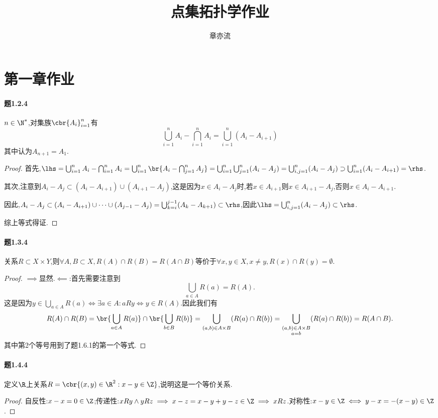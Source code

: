 \documentclass{article}
\title{点集拓扑学作业}
\author{章亦流}
\begin{document}
\maketitle
\tableofcontents

\section{第一章作业}

\paragraph{题1.2.4}$n\in \N^*$,对集族$\cbr{A_i}_{i=1}^n$有
$$\bigcup_{i=1}^n A_i-\bigcap_{i=1}^n A_i=\bigcup_{i=1}^n(A_i-A_{i+1})$$
其中认为$A_{n+1}=A_1$.
\begin{proof}
    首先,$\lhs=\bigcup_{i=1}^n A_i-\bigcap_{i=1}^n A_i=\bigcup_{i=1}^n \br{A_i-\bigcap_{j=1}^n A_j}=\bigcup_{i=1}^n\bigcup_{j=1}^n(A_i-A_j)=\bigcup_{i,j=1}^n (A_i-A_j)\supset \bigcup_{i=1}^n(A_i-A_{i+1})=\rhs$.

    其次,注意到$A_i-A_j\subset (A_i-A_{i+1})\cup (A_{i+1}-A_j)$,这是因为$x\in A_i-A_j$时,若$x\in A_{i+1}$则$x\in A_{i+1}-A_j$,否则$x\in A_i-A_{i+1}$.

    因此,$A_i-A_j\subset (A_i-A_{i+1})\cup \cdots \cup (A_{j-1}-A_j)=\bigcup_{k=i}^{j-1}(A_k-A_{k+1})\subset \rhs$,因此$\lhs=\bigcup_{i,j=1}^n(A_i-A_j)\subset \rhs$.

    综上等式得证.
\end{proof}

\paragraph{题1.3.4}关系$R\subset X\times Y$,则$\forall A,B\subset X, R(A)\cap R(B)=R(A\cap B)$等价于$\forall x,y\in X, x\neq y, R(x)\cap R(y)=\emptyset$.
\begin{proof}
    $\implies$显然.$\impliedby$:首先需要注意到$$\bigcup_{a\in A}R(a)=R(A).$$
    这是因为$y\in \bigcup_{a\in A}R(a)\iff \exists a\in A:aRy\iff y\in R(A)$.因此我们有
    $$R(A)\cap R(B)=\br{\bigcup_{a\in A}R(a)}\cap\br{\bigcup_{b\in B}R(b)}=\bigcup_{(a,b)\in A\times B}(R(a)\cap R(b))=\bigcup_{\substack{(a,b)\in A\times B\\ a=b}}(R(a)\cap R(b))=R(A\cap B).$$
    其中第2个等号用到了题1.6.1的第一个等式.
\end{proof}

\paragraph{题1.4.4}定义$\R$上关系$R=\cbr{(x,y)\in \R^2:x-y\in\Z}$,说明这是一个等价关系.
\begin{proof}
    自反性:$x-x=0\in\Z$;传递性:$xRy\land yRz\implies x-z=x-y+y-z\in\Z\implies xRz$.对称性:$x-y\in\Z\iff y-x=-(x-y)\in\Z$.
\end{proof}
\end{document}
